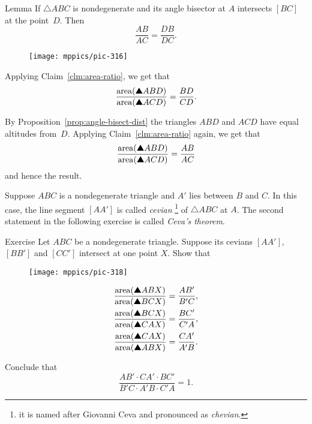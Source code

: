 {\begin{thm*}{Lemma}
If $\triangle A B C$ is nondegenerate and its angle bisector at $A$ intersects $[BC]$ at the point~$D$.
Then 
$$\frac{AB}{AC}=\frac{DB}{DC}.$$
\end{thm*}

\begin{wrapfigure}{r}{30 mm}
\vskip-0mm
\centering
\texttt{[image: mppics/pic-316]}
\end{wrapfigure}

Applying  Claim~\ref{clm:area-ratio}, we get that
\[\frac{\area(\solidtriangle ABD)}{\area(\solidtriangle ACD)}
=\frac{BD}{CD}.\]

By Proposition~\ref{prop:angle-bisect-dist} the triangles $ABD$ and $ACD$ have equal altitudes from~$D$.
Applying  Claim~\ref{clm:area-ratio} again, we get that
\[\frac{\area(\solidtriangle ABD)}{\area(\solidtriangle ACD)}=\frac{AB}{AC}\]
and hence the result.
\qeds

Suppose $ABC$ is a nondegenerate triangle and $A'$ lies between $B$ and $C$.
In this case, the line segment $[AA']$ is called \emph{cevian}%
\footnote{it is named after Giovanni Ceva and pronounced as \emph{chevian}.} of $\triangle ABC$ at $A$.
The second statement in the following exercise is called \emph{Ceva's theorem}.



\begin{thm}{Exercise}\label{ex:ceva}
Let $ABC$ be a nondegenerate triangle.
Suppose its cevians $[AA']$, $[BB']$ and $[CC']$ intersect at one point $X$.
Show that 

\vskip-3mm

{

\begin{wrapfigure}[6]{r}{40 mm}
\vskip4mm
\centering
\texttt{[image: mppics/pic-318]}
\end{wrapfigure}

\begin{align*}
\frac{\area(\solidtriangle ABX)}{\area(\solidtriangle BCX)}&=\frac{AB'}{B'C},
\\
\frac{\area(\solidtriangle BCX)}{\area(\solidtriangle CAX)}&=\frac{BC'}{C'A},
\\
\frac{\area(\solidtriangle CAX)}{\area(\solidtriangle ABX)}&=\frac{CA'}{A'B} .
\end{align*}

}

Conclude that 
\[\frac{AB'\cdot CA'\cdot BC'}{B'C\cdot A'B\cdot C'A}=1.\]
\end{thm}

}
